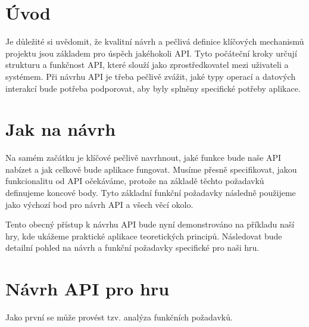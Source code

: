 
\section{Úvod}\label{sec:api-goal}

Je důležité si uvědomit, že kvalitní návrh a pečlivá definice klíčových mechanismů projektu jsou základem pro úspěch jakéhokoli API. Tyto počáteční kroky určují strukturu a funkčnost API, které slouží jako zprostředkovatel mezi uživateli a systémem. Při návrhu API je třeba pečlivě zvážit, jaké typy operací a datových interakcí bude potřeba podporovat, aby byly splněny specifické potřeby aplikace.

\section{Jak na návrh}\label{sec:api-how}

Na samém začátku je klíčové pečlivě navrhnout, jaké funkce bude naše API nabízet a jak celkově bude aplikace fungovat. Musíme přesně specifikovat, jakou funkcionalitu od API očekáváme, protože na základě těchto požadavků definujeme koncové body. Tyto základní funkční požadavky následně použijeme jako výchozí bod pro návrh API a všech věcí okolo.

Tento obecný přístup k návrhu API bude nyní demonstrováno na příkladu naší hry, kde ukážeme praktické aplikace teoretických principů. Následovat bude detailní pohled na návrh a funkční požadavky specifické pro naši hru.


\section{Návrh API pro hru}\label{sec:api-design}

Jako první se může provést tzv. analýza funkčních požadavků.